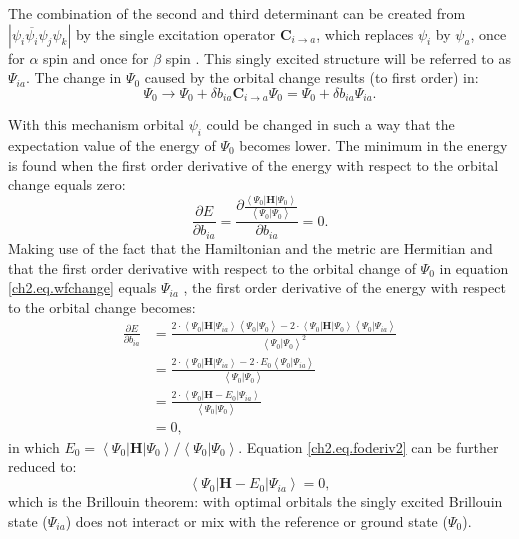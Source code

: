 The combination of the second and third determinant can be created from $|\psi_i\overline{\psi_i}\psi_j\psi_k |$ by the single excitation operator $\mathbf{C}_{i \rightarrow a}$, which replaces $\psi_i$ by $\psi_a$, once for $\alpha$ spin and once for $\beta$ spin \cite{ruttink}. This singly excited structure will be referred to as $\Psi_{ia}$. The change in $\Psi_0$ caused by the orbital change results (to first order) in:
\begin{equation}
\Psi_{0} \rightarrow \Psi_{0} + \delta b_{ia} \mathbf{C}_{i \rightarrow a} \Psi_{0} = \Psi_{0} + \delta b_{ia} \Psi_{ia}.
\label{ch2.eq.wfchange}
\end{equation}

With this mechanism orbital $\psi_i$ could be changed in such a way that the expectation value of the energy of $\Psi_0$ becomes lower. The minimum in the energy is found when the first order derivative of the energy with respect to the orbital change equals zero:
\begin{equation}
\frac{\partial E}{\partial b_{ia}}=\frac{\partial \frac{\left < \Psi_0 | \mathbf{H} | \Psi_0 \right >}{\left < \Psi_0 | \Psi_0 \right >}}{\partial b_{ia}}=0.
\label{ch2.eq.foderiv}
\end{equation}
Making use of the fact that the Hamiltonian and the metric are Hermitian and that the first order derivative with respect to the orbital change of $\Psi_0$ in equation \ref{ch2.eq.wfchange} equals $\Psi_{ia}$ \cite{vbscf2}, the first order derivative of the energy with respect to the orbital change becomes: 
\begin{equation}
\begin{split}
\frac{\partial E}{\partial b_{ia}} & = \frac{2 \cdot \left < \Psi_0 | \mathbf{H} | \Psi_{ia} \right > \left< \Psi_0 | \Psi_0 \right > - 2 \cdot \left < \Psi_0 | \mathbf{H} | \Psi_0  \right > \left< \Psi_0 | \Psi_{ia}\right>}{\left < \Psi_0 | \Psi_0 \right > ^2 }\\
& = \frac{ 2 \cdot \left < \Psi_0 | \mathbf{H} | \Psi_{ia} \right > - 2 \cdot E_0 \left< \Psi_0 | \Psi_{ia} \right >}{\left < \Psi_0 | \Psi_0 \right >}\\
& = \frac{ 2 \cdot \left < \Psi_0 | \mathbf{H} -E_0 | \Psi_{ia} \right >}{\left < \Psi_0 | \Psi_0 \right >}\\
& = 0,
\end{split}
\label{ch2.eq.foderiv2}
\end{equation}
in which $E_0 = \left < \Psi_0 | \mathbf{H} | \Psi_0 \right > / \left < \Psi_0 | \Psi_0 \right >$. Equation \ref{ch2.eq.foderiv2} can be further reduced to:
\begin{equation}
\left < \Psi_0 | \mathbf{H} - E_0 | \Psi_{ia} \right > = 0,
\label{ch2.eq.brillouin}
\end{equation}
which is the Brillouin theorem: with optimal orbitals the singly excited Brillouin state ($\Psi_{ia}$) does not interact or mix with the reference or ground state ($\Psi_0$). 

